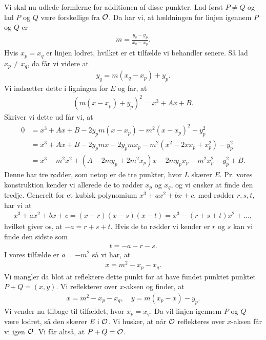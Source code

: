 Vi skal nu udlede formlerne for additionen af disse punkter. Lad først
$P \neq Q$ og lad $P$ og $Q$ være forskellige fra $\mathcal{O}$. Da har vi,
at hældningen for linjen igennem $P$ og $Q$ er 
\begin{align*}
	m = \frac{y_q - y_p}{x_q - x_p}.
\end{align*}
Hvis $x_p = x_q$ er linjen lodret, hvilket er et tilfælde vi behandler
senere. Så lad $x_p \neq x_q$, da får vi videre at 
\begin{align*}
	y_q = m(x_q - x_p) + y_p.
\end{align*}
Vi indsætter dette i ligningen for $E$ og får, at 
\begin{align*}
	(m(x - x_p) + y_p)^2 = x^3 + Ax + B.
\end{align*}
Skriver vi dette ud får vi, at
\begin{align*}
	0 &= x^3 + Ax + B - 2y_p m(x-x_p) - m^2 (x - x_p)^2 - y_{p}^{2} \\
	&= x^3 + Ax + B - 2y_p m x - 2y_ p m x_p - m^2 (x^2 -2xx_p + x_{p}^{2}) - y_{p}^{2} \\
	&= x^3 - m^2 x^2 + (A-2my_p +2m^2x_p)x -2m y_p x_p -m^2 x_{p}^{2} - y_{p}^{2} + B. 
\end{align*}
Denne har tre rødder, som netop er de tre punkter, hvor $L$ skærer $E$.
Pr. vores konstruktion kender vi allerede de to rødder $x_p$ og $x_q$,
og vi ønsker at finde den tredje. Generelt for et kubisk polynomium 
$x^3 + ax^2 + bx + c$, med rødder $r, s, t$, har vi at 
\begin{align*}
	x^3 + ax^2 + bx + c = (x - r)(x - s)(x - t) = x^3 - (r + s + t)x^2 + \ldots,
\end{align*}
hvilket giver os, at $-a = r + s + t$. Hvis de to rødder vi kender er $r$ og $s$
kan vi finde den sidste som
\begin{align*}
	t = -a - r - s.
\end{align*}
I vores tilfælde er $a=-m^2$ så vi har, at 
\begin{align*}
	x = m^2 - x_p - x_q.
\end{align*}
Vi mangler da blot at reflektere dette punkt for at have fundet punktet 
punktet $P+Q=(x, y)$. Vi reflekterer over $x$-aksen og finder, at 
\begin{align*}
	x = m^2 - x_p - x_q, \quad y = m(x_p - x) - y_p.
\end{align*}
Vi vender nu tilbage til tilfældet, hvor $x_p = x_q$. Da vil linjen igennem 
$P$ og $Q$ være lodret, så den skærer $E$ i $\mathcal{O}$. Vi husker, at når $\mathcal{O}$ 
reflekteres over $x$-aksen får vi igen $\mathcal{O}$. Vi får altså, at $P+Q=\mathcal{O}$.

